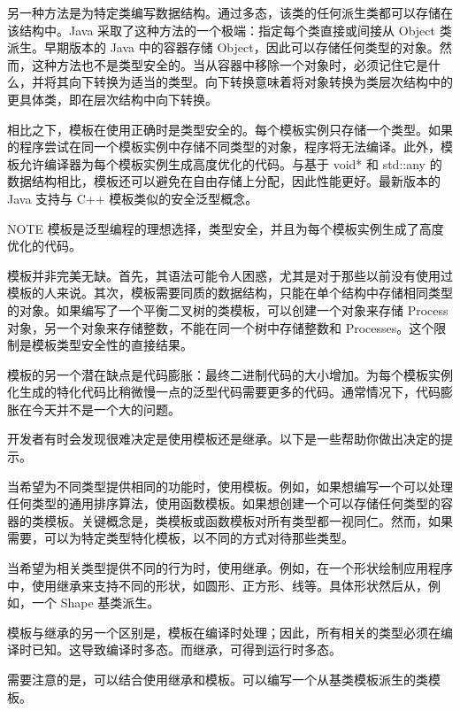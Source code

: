 另一种方法是为特定类编写数据结构。通过多态，该类的任何派生类都可以存储在该结构中。Java 采取了这种方法的一个极端：指定每个类直接或间接从 Object 类派生。早期版本的 Java 中的容器存储 Object，因此可以存储任何类型的对象。然而，这种方法也不是类型安全的。当从容器中移除一个对象时，必须记住它是什么，并将其向下转换为适当的类型。向下转换意味着将对象转换为类层次结构中的更具体类，即在层次结构中向下转换。

相比之下，模板在使用正确时是类型安全的。每个模板实例只存储一个类型。如果的程序尝试在同一个模板实例中存储不同类型的对象，程序将无法编译。此外，模板允许编译器为每个模板实例生成高度优化的代码。与基于 void* 和 std::any 的数据结构相比，模板还可以避免在自由存储上分配，因此性能更好。最新版本的 Java 支持与 C++ 模板类似的安全泛型概念。

\begin{myNotic}{NOTE}
模板是泛型编程的理想选择，类型安全，并且为每个模板实例生成了高度优化的代码。
\end{myNotic}


模板并非完美无缺。首先，其语法可能令人困惑，尤其是对于那些以前没有使用过模板的人来说。其次，模板需要同质的数据结构，只能在单个结构中存储相同类型的对象。如果编写了一个平衡二叉树的类模板，可以创建一个对象来存储 Process 对象，另一个对象来存储整数，不能在同一个树中存储整数和 Processes。这个限制是模板类型安全性的直接结果。

模板的另一个潜在缺点是代码膨胀：最终二进制代码的大小增加。为每个模板实例化生成的特化代码比稍微慢一点的泛型代码需要更多的代码。通常情况下，代码膨胀在今天并不是一个大的问题。


开发者有时会发现很难决定是使用模板还是继承。以下是一些帮助你做出决定的提示。

当希望为不同类型提供相同的功能时，使用模板。例如，如果想编写一个可以处理任何类型的通用排序算法，使用函数模板。如果想创建一个可以存储任何类型的容器的类模板。关键概念是，类模板或函数模板对所有类型都一视同仁。然而，如果需要，可以为特定类型特化模板，以不同的方式对待那些类型。

当希望为相关类型提供不同的行为时，使用继承。例如，在一个形状绘制应用程序中，使用继承来支持不同的形状，如圆形、正方形、线等。具体形状然后从，例如，一个 Shape 基类派生。

模板与继承的另一个区别是，模板在编译时处理；因此，所有相关的类型必须在编译时已知。这导致编译时多态。而继承，可得到运行时多态。

需要注意的是，可以结合使用继承和模板。可以编写一个从基类模板派生的类模板。

